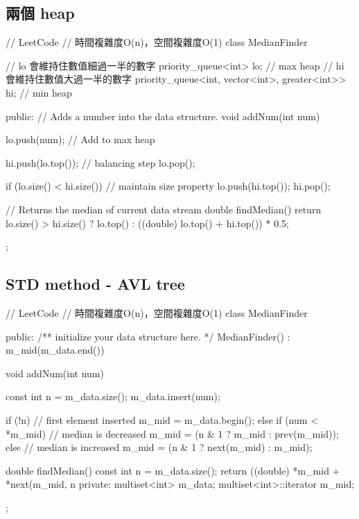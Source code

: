 \subsection{兩個 heap}
\begin{Code}
// LeetCode
// 時間複雜度O(n)，空間複雜度O(1)
class MedianFinder {
    // lo 會維持住數值細過一半的數字
    priority_queue<int> lo; // max heap
    // hi 會維持住數值大過一半的數字
    priority_queue<int, vector<int>, greater<int>> hi; // min heap

public:
    // Adds a number into the data structure.
    void addNum(int num)
    {
        lo.push(num); // Add to max heap

        hi.push(lo.top()); // balancing step
        lo.pop();

        if (lo.size() < hi.size()) { // maintain size property
            lo.push(hi.top());
            hi.pop();
        }
    }

    // Returns the median of current data stream
    double findMedian()
    {
        return lo.size() > hi.size() ? lo.top() : ((double) lo.top() + hi.top()) * 0.5;
    }
};
\end{Code}

\subsection{STD method - AVL tree}
\begin{Code}
// LeetCode
// 時間複雜度O(n)，空間複雜度O(1)
class MedianFinder {
public:
    /** initialize your data structure here. */
    MedianFinder()
        : m_mid(m_data.end()) {

    }

    void addNum(int num) {
        const int n = m_data.size();
        m_data.insert(num);

        if (!n)                                 // first element inserted
            m_mid = m_data.begin();
        else if (num < *m_mid)                    // median is decreased
            m_mid = (n & 1 ? m_mid : prev(m_mid));
        else                                    // median is increased
            m_mid = (n & 1 ? next(m_mid) : m_mid);
    }

    double findMedian() {
        const int n = m_data.size();
        return ((double) *m_mid + *next(m_mid, n %
    }
private:
    multiset<int> m_data;
    multiset<int>::iterator m_mid;
};
\end{Code}
